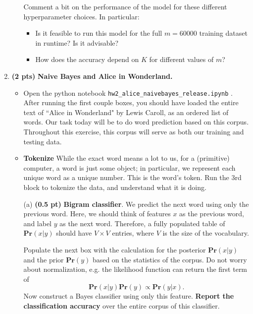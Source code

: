 \documentclass{article}
\newcommand{\pr}{\mathbf{Pr}}
\newcommand{\showpoints}[1]{\textbf{(#1)}}
\begin{document}
\begin{enumerate}
\begin{itemize}
 Comment a bit on the performance of the model for these different hyperparameter choices. In particular:

\begin{itemize}
\item Is it feasible to run this model for the full $m = 60000$ training dataset in runtime? Is it advisable?



\item How does the accuracy depend on $K$ for different values of $m$?





\end{itemize}
\end{itemize}


\item  \showpoints{2 pts}  \textbf{Naive Bayes  and Alice in Wonderland.}

\begin{itemize}
\item Open the python notebook \texttt{hw2\_alice\_naivebayes\_release.ipynb} . After running the first couple boxes, you should have loaded the entire text of ``Alice in Wonderland" by Lewis Caroll, as an ordered list of words. Our task today will be to do word prediction based on this corpus. Throughout this exercise, this corpus will serve as both our training and testing data. 

\item \textbf{Tokenize} While the exact word means a lot to us, for a (primitive) computer, a word is just some object; in particular, we represent each unique word as a unique number. This is the word's token. Run the 3rd block to tokenize the data, and understand what it is doing. 

\item[(a)]\showpoints{0.5 pt}  \textbf{Bigram classifier}. We predict the next word using only the previous word. Here, we should think of features $x$ as the previous word, and label $y$ as the next word. Therefore, a fully populated table of $\pr(x|y)$ should have $V\times V$ entries, where $V$ is the size of the vocabulary.

Populate the next box with the calculation for the posterior $\pr(x|y)$ and the prior $\pr(y)$ based on the statistics of the corpus. Do not worry about normalization, e.g. the likelihood function can return the first term of
\[
\pr(x|y)\pr(y)\propto \pr(y|x).
\]
Now construct a Bayes classifier using only this feature. \textbf{Report the classification accuracy} over the entire corpus of this classifier.



\end{itemize}
\end{enumerate}
\end{document}
